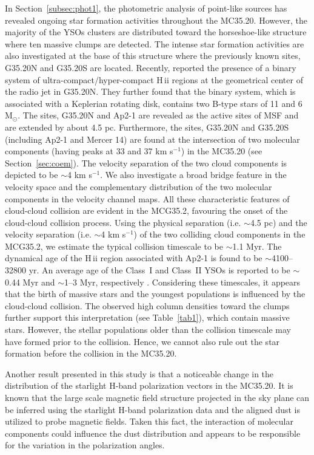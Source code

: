 \documentclass[iop]{emulateapj}
\begin{document}
In Section~\ref{subsec:phot1}, the photometric analysis of point-like sources has revealed 
ongoing star formation activities throughout the MC35.20. However, 
the majority of the YSOs clusters are distributed toward the horseshoe-like structure where ten massive 
clumps are detected. The intense star formation activities are also investigated at the base of this structure where 
the previously known sites, G35.20N and G35.20S are located. 
Recently, \citet{beltran16} reported the presence of a binary system of ultra-compact/hyper-compact H\,{\sc ii} 
regions at the geometrical center of the radio jet in G35.20N. They further found that the binary system, which is 
associated with a Keplerian rotating disk, contains two B-type stars of 11 and 6 M$_{\odot}$. 
The sites, G35.20N and Ap2-1 are revealed as the active sites of MSF and are extended by about 4.5 pc.
Furthermore, the sites, G35.20N and G35.20S (including Ap2-1 and Mercer 14) are found at the intersection of two molecular components 
(having peaks at 33 and 37 km s$^{-1}$) in the MC35.20 (see Section~\ref{sec:coem}). 
The velocity separation of the two cloud components is depicted to be $\sim$4 km s$^{-1}$. 
We also investigate a broad bridge feature in the velocity space and the complementary distribution of 
the two molecular components in the velocity channel maps. 
All these characteristic features of cloud-cloud collision are evident in the MCG35.2, 
favouring the onset of the cloud-cloud collision process. Using the physical separation (i.e. $\sim$4.5 pc) 
and the velocity separation (i.e. $\sim$4 km s$^{-1}$) of the two colliding cloud components in the MCG35.2, 
we estimate the typical collision timescale to be $\sim$1.1 Myr. 
The dynamical age of the H\,{\sc ii} region associated with Ap2-1 is found to be $\sim$4100--32800 yr. 
An average age of the Class~I and Class~II YSOs is reported to be $\sim$0.44 Myr and $\sim$1--3 Myr, respectively \citep{evans09}. 
Considering these timescales, it appears that the birth of massive stars and the youngest populations 
is influenced by the cloud-cloud collision. The observed high column densities toward the clumps 
further support this interpretation (see Table~\ref{tab1}), which contain massive stars. 
However, the stellar populations older than the collision timescale may have formed prior to the collision. 
Hence, we cannot also rule out the star formation before the collision in the MC35.20.

Another result presented in this study is that a noticeable change in the distribution of the starlight H-band polarization vectors in the MC35.20.  
It is known that the large scale magnetic field structure projected in the sky plane can be inferred using the starlight H-band polarization data and 
the aligned dust is utilized to probe magnetic fields. Taken this fact, the interaction of molecular components could influence the dust distribution 
and appears to be responsible for the variation in the polarization angles. 
%
\end{document}
